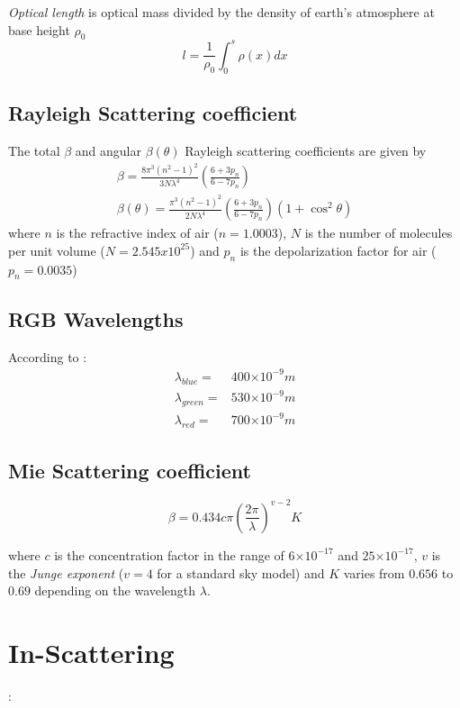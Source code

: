 \documentclass[12pt,a4paper]{scrartcl}
\newcommand{\e}[1]{\ensuremath{\times 10^{#1}}}
\begin{document}
\emph{Optical length} is optical mass divided by the density of earth's atmosphere at base height $\rho_0$
\begin{equation}
l = \frac{1}{\rho_0} \int^s_0 \rho(x)dx
\end{equation}


\subsection{Rayleigh Scattering coefficient}
The total $\beta$ and angular $\beta(\theta)$ Rayleigh scattering coefficients are given by \cite{Preetham03Modeling-skylight}
\begin{gather}
\beta = \frac{8 \pi^3(n^2 - 1)^2}{3N\lambda^4} \left(\frac{6 + 3 p_n}{6 - 7 p_n} \right) \\
\beta(\theta) = \frac{\pi^3(n^2 - 1)^2}{2N\lambda^4} \left(\frac{6 + 3 p_n}{6 - 7 p_n} \right) (1 +  \cos^2 \theta)
\end{gather}
where $n$ is the refractive index of air ($n = 1.0003$), $N$ is the number of molecules per unit volume ($N = 2.545x10^{25}$) and $p_n$ is the depolarization factor for air ($p_n = 0.0035$)

\subsection{RGB Wavelengths}
According to \cite{Preetham03Modeling-skylight}:
\begin{align}
\lambda_{blue} =& 400\e{-9}m \\
\lambda_{green} =& 530\e{-9}m \\
\lambda_{red} =& 700\e{-9}m
\end{align}

\subsection{Mie Scattering coefficient}
\begin{equation}
\beta = 0.434 c \pi \left(\frac{2 \pi}{\lambda}\right)^{v-2}K
\end{equation}

where $c$ is the concentration factor in the range of $6\e{-17}$ and $25\e{-17}$, $v$ is the \emph{Junge exponent} ($v = 4 $ for a standard sky model) and  $K$ varies from $0.656$ to $0.69$ depending on the wavelength $\lambda$.


\section{In-Scattering}
\cite{Preetham03Modeling-skylight}:
\end{document}
